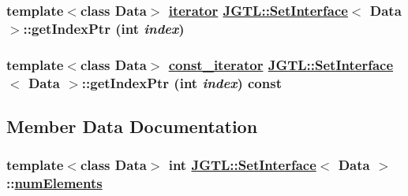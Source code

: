 \hypertarget{class_j_g_t_l_1_1_set_interface_a55fad0448297a2946f29cf3e3915af7}{
\subsubsection[getIndexPtr]{\setlength{\rightskip}{0pt plus 5cm}template$<$class Data$>$ \hyperlink{class_j_g_t_l_1_1_set_interface_1f4b953e9a9adb5d463b6abb24623372}{iterator} \hyperlink{class_j_g_t_l_1_1_set_interface}{JGTL::Set\-Interface}$<$ Data $>$::get\-Index\-Ptr (int {\em index})}}
\label{class_j_g_t_l_1_1_set_interface_a55fad0448297a2946f29cf3e3915af7}


\hypertarget{class_j_g_t_l_1_1_set_interface_acf7a261d06754d70004ed676c90d4e9}{
\subsubsection[getIndexPtr]{\setlength{\rightskip}{0pt plus 5cm}template$<$class Data$>$ \hyperlink{class_j_g_t_l_1_1_set_interface_1e545e77790db36de24904dc70054225}{const\_\-iterator} \hyperlink{class_j_g_t_l_1_1_set_interface}{JGTL::Set\-Interface}$<$ Data $>$::get\-Index\-Ptr (int {\em index}) const}}
\label{class_j_g_t_l_1_1_set_interface_acf7a261d06754d70004ed676c90d4e9}




\subsection{Member Data Documentation}
\hypertarget{class_j_g_t_l_1_1_set_interface_3c8282b939324cb187d18825105433fa}{
\subsubsection[numElements]{\setlength{\rightskip}{0pt plus 5cm}template$<$class Data$>$ int \hyperlink{class_j_g_t_l_1_1_set_interface}{JGTL::Set\-Interface}$<$ Data $>$::\hyperlink{class_j_g_t_l_1_1_set_interface_3c8282b939324cb187d18825105433fa}{num\-Elements}}}
\label{class_j_g_t_l_1_1_set_interface_3c8282b939324cb187d18825105433fa}


